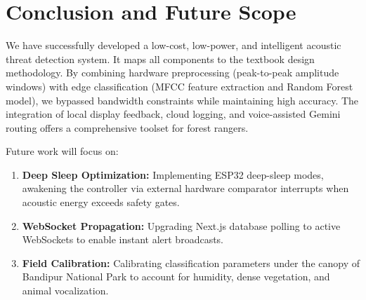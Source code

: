 \documentclass[11pt,a4paper]{article}
\begin{document}
\section{Conclusion and Future Scope}
We have successfully developed a low-cost, low-power, and intelligent acoustic threat detection system. It maps all components to the textbook design methodology. By combining hardware preprocessing (peak-to-peak amplitude windows) with edge classification (MFCC feature extraction and Random Forest model), we bypassed bandwidth constraints while maintaining high accuracy. The integration of local display feedback, cloud logging, and voice-assisted Gemini routing offers a comprehensive toolset for forest rangers.

Future work will focus on:
\begin{enumerate}
    \item \textbf{Deep Sleep Optimization:} Implementing ESP32 deep-sleep modes, awakening the controller via external hardware comparator interrupts when acoustic energy exceeds safety gates.
    \item \textbf{WebSocket Propagation:} Upgrading Next.js database polling to active WebSockets to enable instant alert broadcasts.
    \item \textbf{Field Calibration:} Calibrating classification parameters under the canopy of Bandipur National Park to account for humidity, dense vegetation, and animal vocalization.
\end{enumerate}
\end{document}
